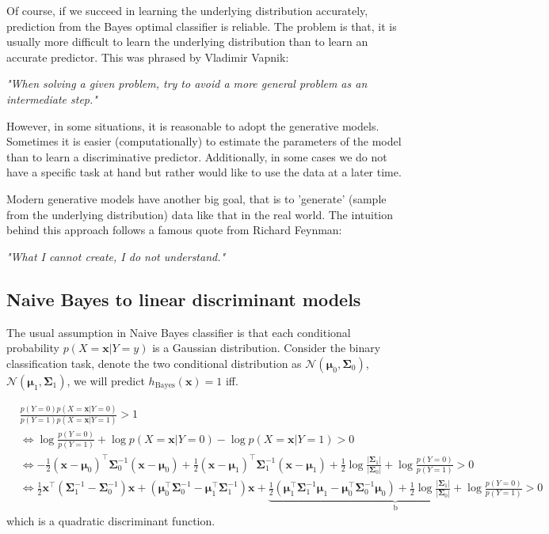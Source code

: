 \documentclass{article}
\begin{document}
	Of course, if we succeed in learning the underlying distribution accurately, prediction from the Bayes optimal classifier is reliable. The problem is that, it is usually more difficult to learn the underlying distribution than to learn an accurate predictor. This was phrased by Vladimir Vapnik:
	\begin{center}
	\textit{"When solving a given problem, try to avoid a more general problem as an intermediate step."}
	\end{center}

	However, in some situations, it is reasonable to adopt the generative models. Sometimes it is easier (computationally) to estimate the parameters of the model than to learn a discriminative predictor. Additionally, in some cases we do not have a specific task at hand but rather would like to use the data at a later time.
	
	Modern generative models have another big goal, that is to 'generate' (sample from the underlying distribution) data like that in the real world. The intuition behind this approach follows a famous quote from Richard Feynman:	
	\begin{center}
	\textit{"What I cannot create, I do not understand."}
	\end{center}

	\subsection{Naive Bayes to linear discriminant models}
	The usual assumption in Naive Bayes classifier is that each conditional probability $p(X=\bm{x}|Y=y)$ is a Gaussian distribution. Consider the binary classification task, denote the two conditional distribution as $\mathcal{N}(\bm{\mu}_0,\bm{\Sigma}_0)$, $\mathcal{N}(\bm{\mu}_1,\bm{\Sigma}_1)$, we will predict $h_{\mathrm{Bayes}}(\bm{x})=1$ iff.
	
	\begin{equation*}
	\begin{split}
	&\frac{p(Y=0) p(X=\bm{x}|Y=0)}{p(Y=1) p(X=\bm{x}|Y=1)} > 1 \\
	&\iff \log \frac{p(Y=0)}{p(Y=1)} + \log p(X=\bm{x}|Y=0) - \log p(X=\bm{x}|Y=1) > 0 \\
	&\iff -\frac{1}{2}(\bm{x}-\bm{\mu}_0)^\top \bm{\Sigma}_0^{-1}(\bm{x}-\bm{\mu}_0) + \frac{1}{2}(\bm{x}-\bm{\mu}_1)^\top \bm{\Sigma}_1^{-1}(\bm{x}-\bm{\mu}_1) +  \frac{1}{2}\log\frac{|\bm{\Sigma}_1|}{|\bm{\Sigma}_0|} + \log \frac{p(Y=0)}{p(Y=1)} > 0 \\
	&\iff \frac{1}{2} \bm{x}^\top ( \bm{\Sigma}_1^{-1} - \bm{\Sigma}_0^{-1}) \bm{x} + (\bm{\mu}_0^\top\bm{\Sigma}_0^{-1} - \bm{\mu}_1^\top\bm{\Sigma}_1^{-1}) \bm{x} + \underbrace{\frac{1}{2} (\bm{\mu}_1^\top\bm{\Sigma}_1^{-1}\bm{\mu}_1 - \bm{\mu}_0^\top\bm{\Sigma}_0^{-1}\bm{\mu}_0 ) + \frac{1}{2}\log\frac{|\bm{\Sigma}_1|}{|\bm{\Sigma}_0|} + \log \frac{p(Y=0)}{p(Y=1)}}_{\mathrm{b}} > 0
	\end{split}
	\end{equation*}
which is a quadratic discriminant function.
\end{document}
